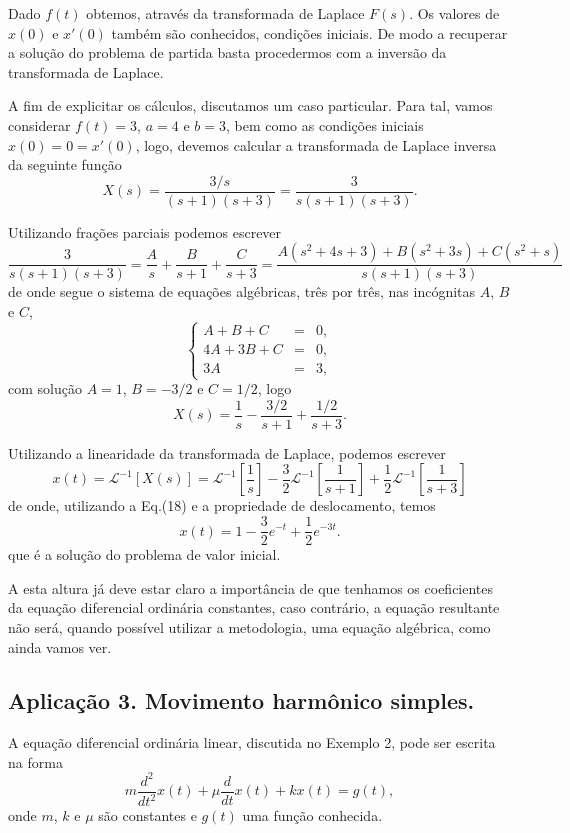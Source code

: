 Dado $f(t)$ obtemos, através da transformada de Laplace $F(s)$. Os valores de $x(0)$ e $x'(0)$ também são conhecidos, condições iniciais. De modo a recuperar a solução do problema de partida basta procedermos com a inversão da transformada de Laplace.

A fim de explicitar os cálculos, discutamos um caso particular. Para tal, vamos considerar $f(t) = 3$, $a = 4$ e $b = 3$, bem como as condições iniciais $x(0) = 0 = x'(0)$, logo, devemos calcular a transformada de Laplace inversa da seguinte função
$$X(s) =
\dfrac{3/s}{(s + 1)(s + 3)}
=
\dfrac{3}{s(s + 1)(s + 3)}.
$$

Utilizando frações parciais podemos escrever
$$\dfrac{3}{s(s + 1)(s + 3)}
=
\dfrac{A}{s}
+
\dfrac{B}{s + 1}
+
\dfrac{C}{s + 3}
=
\dfrac{A (s^{2} + 4s + 3) + B(s^{2} + 3s) + C(s^{2} + s)}{s(s + 1)(s + 3)}
$$
de onde segue o sistema de equações algébricas, três por três, nas incógnitas $A$, $B$ e $C$,
$$\left\{\begin{array}{rcl}
A + B + C &=& 0, \\
4A + 3B + C &=& 0, \\
3A &=& 3,
\end{array}\right.$$
com solução $A = 1$, $B = -3/2$ e $C = 1/2$, logo
$$X(s) =
\dfrac{1}{s} - \dfrac{3/2}{s + 1}
+
\dfrac{1/2}{s + 3}.
$$

Utilizando a linearidade da transformada de Laplace, podemos escrever
$$x(t) = \mathscr{L}^{-1}[X(s)]
= \mathscr{L}^{-1}
\left[
\dfrac{1}{s}
\right]
-
\dfrac{3}{2}
\mathscr{L}^{-1}
\left[
\dfrac{1}{s + 1}
\right]
+
\dfrac{1}{2}
\mathscr{L}^{-1}
\left[
\dfrac{1}{s + 3}
\right]$$
de onde, utilizando a Eq.(18) e a propriedade de deslocamento, temos
$$x(t) = 1 - \dfrac{3}{2} e^{-t} + \dfrac{1}{2} e^{-3t}.$$
que é a solução do problema de valor inicial.

A esta altura já deve estar claro a importância de que tenhamos os coeficientes da equação diferencial ordinária constantes, caso contrário, a equação resultante não será, quando possível utilizar a metodologia, uma equação algébrica, como ainda vamos ver.

\subsection{Aplicação 3. Movimento harmônico simples.}

A equação diferencial ordinária linear, discutida no Exemplo 2, pode ser escrita na forma
$$m \dfrac{d^{2}}{dt^{2}} x(t) + \mu \dfrac{d}{dt} x(t) + k x(t) = g(t),$$
onde $m$, $k$ e $\mu$ são constantes e $g(t)$ uma função conhecida.

